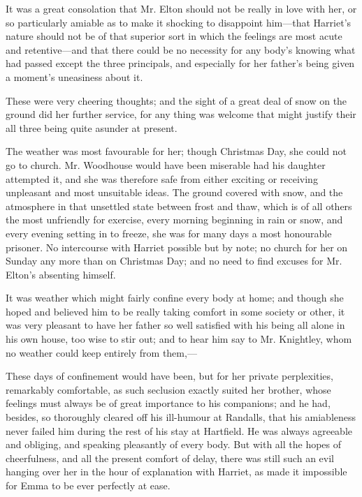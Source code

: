 It was a great consolation that Mr. Elton should not be really in love with her, or so particularly amiable as to make it shocking to disappoint him---that Harriet's nature should not be of that superior sort in which the feelings are most acute and retentive---and that there could be no necessity for any body's knowing what had passed except the three principals, and especially for her father's being given a moment's uneasiness about it.

These were very cheering thoughts; and the sight of a great deal of snow on the ground did her further service, for any thing was welcome that might justify their all three being quite asunder at present.

The weather was most favourable for her; though Christmas Day, she could not go to church. Mr. Woodhouse would have been miserable had his daughter attempted it, and she was therefore safe from either exciting or receiving unpleasant and most unsuitable ideas. The ground covered with snow, and the atmosphere in that unsettled state between frost and thaw, which is of all others the most unfriendly for exercise, every morning beginning in rain or snow, and every evening setting in to freeze, she was for many days a most honourable prisoner. No intercourse with Harriet possible but by note; no church for her on Sunday any more than on Christmas Day; and no need to find excuses for Mr. Elton's absenting himself.

It was weather which might fairly confine every body at home; and though she hoped and believed him to be really taking comfort in some society or other, it was very pleasant to have her father so well satisfied with his being all alone in his own house, too wise to stir out; and to hear him say to Mr. Knightley, whom no weather could keep entirely from them,---


These days of confinement would have been, but for her private perplexities, remarkably comfortable, as such seclusion exactly suited her brother, whose feelings must always be of great importance to his companions; and he had, besides, so thoroughly cleared off his ill-humour at Randalls, that his amiableness never failed him during the rest of his stay at Hartfield. He was always agreeable and obliging, and speaking pleasantly of every body. But with all the hopes of cheerfulness, and all the present comfort of delay, there was still such an evil hanging over her in the hour of explanation with Harriet, as made it impossible for Emma to be ever perfectly at ease.

